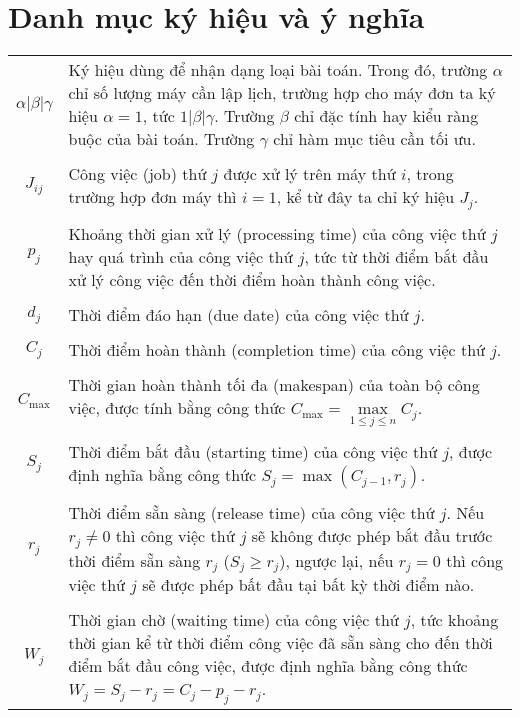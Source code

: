 \documentclass[12pt,a4paper]{report}
\begin{document}
	\chapter*{Danh mục ký hiệu và ý nghĩa}
	\thispagestyle{fancy}
	\begin{tabularx}{\linewidth}{ c  X }
		$\alpha | \beta | \gamma$ & Ký hiệu dùng để nhận dạng loại bài toán. Trong đó, trường $\alpha$ chỉ số lượng máy cần lập lịch, trường hợp cho máy đơn ta ký hiệu $\alpha = 1$, tức $1| \beta | \gamma$. Trường $\beta$ chỉ đặc tính hay kiểu ràng buộc của bài toán. Trường $\gamma$ chỉ hàm mục tiêu cần tối ưu. \\
		\\
		$J_{ij}$ & Công việc (job) thứ $j$ được xử lý trên máy thứ $i$, trong trường hợp đơn máy thì $i=1$, kể từ đây ta chỉ ký hiệu $J_j$. \\
		\\
		$p_j$ & Khoảng thời gian xử lý (processing time) của công việc thứ $j$ hay quá trình của công việc thứ $j$, tức từ thời điểm bắt đầu xử lý công việc đến thời điểm hoàn thành công việc. \\
		\\
		$d_j$ & Thời điểm đáo hạn (due date) của công việc thứ $j$. \\
		\\
		$C_j$ & Thời điểm hoàn thành (completion time) của công việc thứ $j$. \\
		\\
		$C_{\max}$ & Thời gian hoàn thành tối đa (makespan) của toàn bộ công việc, được tính bằng công thức $C_{\max} = \underset{1 \leq j \leq n}{\max} C_j$. \\
		\\
		$S_j$ & Thời điểm bắt đầu (starting time) của công việc thứ $j$, được định nghĩa bằng công thức $S_j = \max (C_{j-1}, r_j)$. \\
		\\
		$r_j$ & Thời điểm sẵn sàng (release time) của công việc thứ $j$. Nếu $r_j \neq 0$ thì công việc thứ $j$ sẽ không được phép bắt đầu trước thời điểm sẵn sàng $r_j$ ($S_j \geq r_j$), ngược lại, nếu $r_j = 0$ thì công việc thứ $j$ sẽ được phép bất đầu tại bất kỳ thời điểm nào. \\
		\\
		$W_j$ & Thời gian chờ (waiting time) của công việc thứ $j$, tức khoảng thời gian kể từ thời điểm công việc đã sẵn sàng cho đến thời điểm bắt đầu công việc, được định nghĩa bằng công thức $W_j = S_j - r_j = C_j - p_j - r_j$. \\

\end{tabularx}
\end{document}

